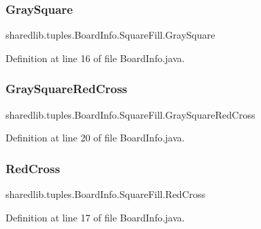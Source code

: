 \subsubsection{\texorpdfstring{Gray\+Square}{GraySquare}}
{\footnotesize\ttfamily sharedlib.\+tuples.\+Board\+Info.\+Square\+Fill.\+Gray\+Square}



Definition at line 16 of file Board\+Info.\+java.

\hypertarget{enumsharedlib_1_1tuples_1_1_board_info_1_1_square_fill_a98d84dff30d9ea103819323197f896a0}{}\label{enumsharedlib_1_1tuples_1_1_board_info_1_1_square_fill_a98d84dff30d9ea103819323197f896a0} 
\subsubsection{\texorpdfstring{Gray\+Square\+Red\+Cross}{GraySquareRedCross}}
{\footnotesize\ttfamily sharedlib.\+tuples.\+Board\+Info.\+Square\+Fill.\+Gray\+Square\+Red\+Cross}



Definition at line 20 of file Board\+Info.\+java.

\hypertarget{enumsharedlib_1_1tuples_1_1_board_info_1_1_square_fill_aa9a2d707736eeba8ad5b23cc21ca8c1d}{}\label{enumsharedlib_1_1tuples_1_1_board_info_1_1_square_fill_aa9a2d707736eeba8ad5b23cc21ca8c1d} 
\subsubsection{\texorpdfstring{Red\+Cross}{RedCross}}
{\footnotesize\ttfamily sharedlib.\+tuples.\+Board\+Info.\+Square\+Fill.\+Red\+Cross}



Definition at line 17 of file Board\+Info.\+java.

\hypertarget{enumsharedlib_1_1tuples_1_1_board_info_1_1_square_fill_a55b8ce021c2e15b5edc7da5ec8204c92}{}\label{enumsharedlib_1_1tuples_1_1_board_info_1_1_square_fill_a55b8ce021c2e15b5edc7da5ec8204c92} 
